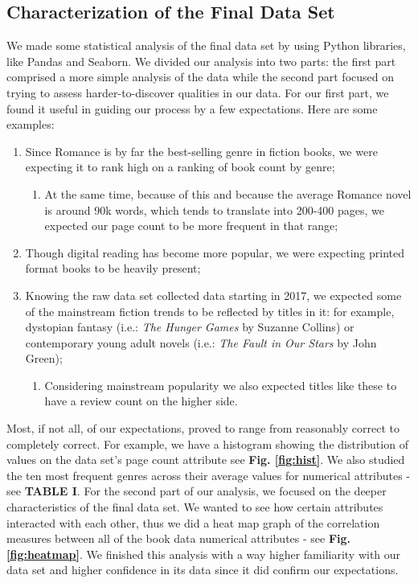 \documentclass[conference]{IEEEtran}
\begin{document}
\subsection{Characterization of the Final Data Set}
We made some statistical analysis of the final data set by using Python libraries, like Pandas and Seaborn. \newline
We divided our analysis into two parts: the first part comprised a more simple analysis of the data while the second part focused on trying to assess harder-to-discover qualities in our data.
For our first part, we found it useful in guiding our process by a few expectations. Here are some examples:
\begin{enumerate}
    \item Since Romance is by far the best-selling genre in fiction books, we were expecting it to rank high on a ranking of book count by genre;
        \begin{enumerate}
            \item At the same time, because of this and because the average Romance novel is around 90k words, which tends to translate into 200-400 pages, we expected our page count to be more frequent in that range;
        \end{enumerate}
    \item Though digital reading has become more popular, we were expecting printed format books to be heavily present;
    \item Knowing the raw data set collected data starting in 2017, we expected some of the mainstream fiction trends to be reflected by titles in it: for example, dystopian fantasy (i.e.: \textit{The Hunger Games} by Suzanne Collins) or contemporary young adult novels (i.e.: \textit{The Fault in Our Stars} by John Green);
        \begin{enumerate}
            \item Considering mainstream popularity we also expected titles like these to have a review count on the higher side.
        \end{enumerate}
\end{enumerate}
Most, if not all, of our expectations, proved to range from reasonably correct to completely correct. For example, we have a histogram showing the distribution of values on the data set's page count attribute see \textbf{Fig. \ref{fig:hist}}. We also studied the ten most frequent genres across their average values for numerical attributes - see \textbf{TABLE I}. \newline 
For the second part of our analysis, we focused on the deeper characteristics of the final data set. We wanted to see how certain attributes interacted with each other, thus we did a heat map graph of the correlation measures between all of the book data numerical attributes - see \textbf{Fig. \ref{fig:heatmap}}.
We finished this analysis with a way higher familiarity with our data set and higher confidence in its data since it did confirm our expectations.
\end{document}
